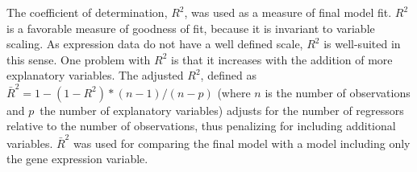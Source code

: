 The coefficient of determination, $R^2$, was used as a measure of final model
fit. $R^2$ is a favorable measure of goodness of fit, because it is invariant
to variable scaling. As expression data do not have a well defined scale,
$R^2$ is well-suited in this sense. One problem with $R^2$ is that it
increases with the addition of more explanatory variables. The adjusted $R^2$,
defined as $\bar{R}^2 = 1-(1-R^2)*(n-1)/(n-p)$ (where $n$ is the number of
observations and $p$ the number of explanatory variables) adjusts for the
number of regressors relative to the number of observations, thus penalizing
for including additional variables. $\bar{R}^2$ was used for comparing the
final model with a model including only the gene expression variable.
